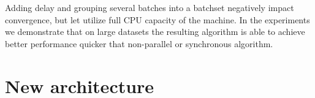 \documentclass[russian,english]{llncs}
\newcounter{wavenum}
\newcommand*{\clki}{
  \draw (t_cur) -- ++(0,.0) -- ++(.5,0) -- ++(0,-.0) -- ++(.5,0) -- ++(0,.0)
    node[time] (t_cur) {};
}
\newcommand*{\bitvector}[6]{
  \fill[fill=#3, pattern=#5, pattern color=#4,fill opacity=#6]
                         (t_cur) -- ++( .0, .2) -- ++(#2-.0,0) -- ++(.0, -.18)
                         -- ++(-.0,-.18) -- ++(.0-#2,0) -- cycle;
  \path (t_cur) -- node[anchor=mid] {#1} ++(#2,0) node[time] (t_cur) {};
}
\newcommand*{\Wait}[2]{
    \bitvector{#1}{#2}{white}{white}{}{0.0}
}
\newcommand*{\ProcBatchOne}[2][XXX]{
    \bitvector{#1}{#2}{orange}{orange}{}{1.0}
}
\newcommand*{\ProcBatchTwo}[2][XXX]{
    \bitvector{#1}{#2}{yellow}{yellow}{}{1.0}
}
\newcommand*{\Normalization}[2][XXX]{
    \bitvector{#1}{#2}{green}{green}{}{1.0}
}
\newcommand*{\Merge}[2][XXX]{
    \bitvector{#1}{#2}{blue}{blue}{}{1.0}
}
\newcommand{\nextwave}[1]{
  \path (0,\value{wavenum} * 0.5) node[left] {#1} node[time] (t_cur) {};
  \addtocounter{wavenum}{-1}
}
\newenvironment{wave}[3][\bf{time}]{
  \begin{tikzpicture}[draw=black, yscale=1.5,xscale=1.0]
    \tikzstyle{time}=[coordinate]
    \setlength{\unitlength}{1cm}
    \def\wavewidth{#3}
    \setcounter{wavenum}{0}
    \nextwave{#1}

    \draw[dotted] (t_cur) +(0,.1) node[above] {t=0\%} -- ++(0,2.8-#2);
    \clki
    \foreach \t in {1,...,\wavewidth}{
      \draw[dotted] (t_cur) +(0,.1) node[above] {\t0\%} -- ++(0,2.8-#2);
      \clki
    }
}{\end{tikzpicture}}
\begin{document}

Adding delay and grouping several batches into a batchset negatively impact convergence,
but let utilize full CPU capacity of the machine.
In the experiments we demonstrate that on large datasets the resulting algorithm
is able to achieve better performance quicker that non-parallel or synchronous algorithm.

\section{New architecture}
\label{sec:Architecture}
\end{document}
